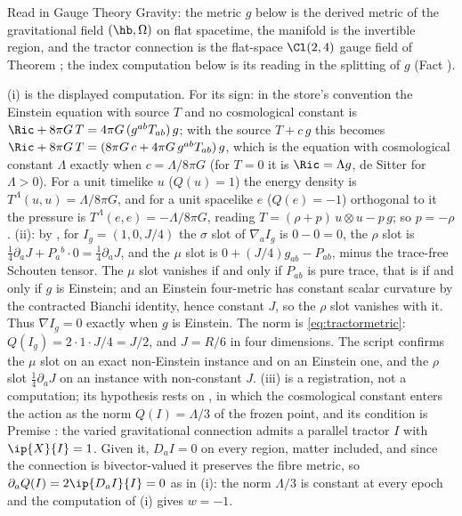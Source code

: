 Read in Gauge Theory Gravity: the metric $g$ below is the derived metric of the gravitational field $(\hb, \Omega)$ on flat spacetime, the manifold is the invertible region, and the tractor connection is the flat-space $\Cl(2,4)$ gauge field of Theorem ; the index computation below is its reading in the splitting of $g$ (Fact ).

(i) is the displayed computation. For its sign: in the store's convention the Einstein equation with source $T$ and no cosmological constant is $\Ric + 8\pi G\,T = 4\pi G\,(g^{ab}T_{ab})\,g$; with the source $T + c\,g$ this becomes $\Ric + 8\pi G\,T = (8\pi G\,c + 4\pi G\,g^{ab}T_{ab})\,g$, which is the equation with cosmological constant $\Lambda$ exactly when $c = \Lambda/8\pi G$ (for $T = 0$ it is $\Ric = \Lambda g$, de Sitter for $\Lambda > 0$). For a unit timelike $u$ ($Q(u) = 1$) the energy density is $T^{\Lambda}(u, u) = \Lambda/8\pi G$, and for a unit spacelike $e$ ($Q(e) = -1$) orthogonal to it the pressure is $T^{\Lambda}(e, e) = -\Lambda/8\pi G$, reading $T = (\rho + p)\,u\otimes u - p\,g$; so $p = -\rho$. (ii): by , for $I_g = (1, 0, J/4)$ the $\sigma$ slot of $\nabla_a I_g$ is $0 - 0 = 0$, the $\rho$ slot is $\tfrac14\partial_a J + P_a{}^b\cdot 0 = \tfrac14\partial_a J$, and the $\mu$ slot is $0 + (J/4)g_{ab} - P_{ab}$, minus the trace-free Schouten tensor. The $\mu$ slot vanishes if and only if $P_{ab}$ is pure trace, that is if and only if $g$ is Einstein; and an Einstein four-metric has constant scalar curvature by the contracted Bianchi identity, hence constant $J$, so the $\rho$ slot vanishes with it. Thus $\nabla I_g = 0$ exactly when $g$ is Einstein. The norm is \eqref{eq:tractormetric}: $Q(I_g) = 2\cdot 1\cdot J/4 = J/2$, and $J = R/6$ in four dimensions. The script confirms the $\mu$ slot on an exact non-Einstein instance and on an Einstein one, and the $\rho$ slot $\tfrac14\partial_a J$ on an instance with non-constant $J$. (iii) is a registration, not a computation; its hypothesis rests on , in which the cosmological constant enters the action as the norm $Q(I) = \Lambda/3$ of the frozen point, and its condition is Premise : the varied gravitational connection admits a parallel tractor $I$ with $\ip{X}{I} = 1$. Given it, $D_{a}I = 0$ on every region, matter included, and since the connection is bivector-valued it preserves the fibre metric, so $\partial_{a}Q(I) = 2\ip{D_{a}I}{I} = 0$ as in (i): the norm $\Lambda/3$ is constant at every epoch and the computation of (i) gives $w = -1$.
